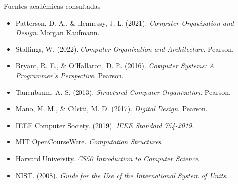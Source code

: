 \documentclass[10pt,aspectratio=169]{beamer}
\begin{document}
	
	\begin{frame}{Fuentes académicas consultadas}
		
		\tiny
		
		\begin{itemize}
			
			\item Patterson, D. A., \& Hennessy, J. L. (2021). \textit{Computer Organization and Design}. Morgan Kaufmann.
			
			\item Stallings, W. (2022). \textit{Computer Organization and Architecture}. Pearson.
			
			\item Bryant, R. E., \& O'Hallaron, D. R. (2016). \textit{Computer Systems: A Programmer's Perspective}. Pearson.
			
			\item Tanenbaum, A. S. (2013). \textit{Structured Computer Organization}. Pearson.
			
			\item Mano, M. M., \& Ciletti, M. D. (2017). \textit{Digital Design}. Pearson.
			
			\item IEEE Computer Society. (2019). \textit{IEEE Standard 754-2019}.
			
			\item MIT OpenCourseWare. \textit{Computation Structures}.
			
			\item Harvard University. \textit{CS50 Introduction to Computer Science}.
			
			\item NIST. (2008). \textit{Guide for the Use of the International System of Units}.
			
		\end{itemize}
		
	\end{frame}
	
	
\end{document}
